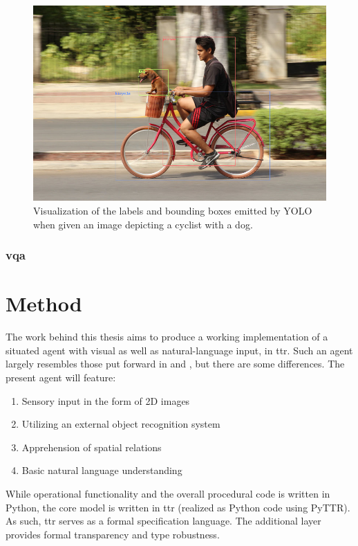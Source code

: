 \documentclass[11pt, a4paper]{article}
\begin{document}
\begin{figure}[h]
\label{fig:dogbike_annotated}
\includegraphics[width=\textwidth]{dogbike_annotated}
\centering
\caption{Visualization of the labels and bounding boxes emitted by YOLO when given an image depicting a cyclist with a dog.}
\end{figure}

\subsubsection{\Acrfull{vqa}}



\section{Method}
\label{sec:method}

The work behind this thesis aims to produce a working implementation of a situated agent with visual as well as natural-language input, in \gls{ttr}.
Such an agent largely resembles those put forward in \cite{lspc} and \cite{ttrspat}, but there are some differences.
The present agent will feature:

\begin{enumerate}
\item Sensory input in the form of 2D images
\item Utilizing an external object recognition system
\item Apprehension of spatial relations
\item Basic natural language understanding
\end{enumerate}

While operational functionality and the overall procedural code is written in Python, the core model is written in \gls{ttr} (realized as Python code using PyTTR).
As such, \gls{ttr} serves as a formal specification language.
The additional layer provides formal transparency and type robustness.
\end{document}
